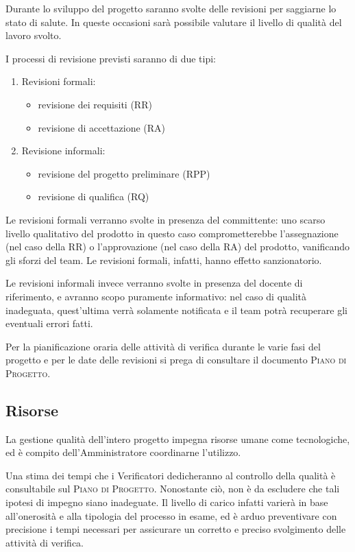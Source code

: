 \documentclass[11pt,a4paper]{article}
\begin{document}
Durante lo sviluppo del progetto saranno svolte delle revisioni per saggiarne lo stato di salute. In queste occasioni sarà possibile valutare il livello di qualità del lavoro svolto.

I processi di revisione previsti saranno di due tipi:
\begin{enumerate}
 	\item Revisioni formali:
	\begin{itemize}
		\item revisione dei requisiti (RR)
		\item revisione di accettazione (RA)
	\end{itemize}
 	\item Revisione informali:
	\begin{itemize}
		\item revisione del progetto preliminare (RPP)
		\item revisione di qualifica (RQ)
	\end{itemize}
\end{enumerate}
Le revisioni formali verranno svolte in presenza del committente: uno scarso livello qualitativo del prodotto in questo caso comprometterebbe l'assegnazione (nel caso della RR) o l'approvazione (nel caso della RA) del prodotto, vanificando gli sforzi del team. Le revisioni formali, infatti, hanno effetto sanzionatorio.

Le revisioni informali invece verranno svolte in presenza del docente di riferimento, e avranno scopo puramente informativo: nel caso di qualità ina\-deguata, quest'ultima verrà solamente notificata e il team potrà recuperare gli eventuali errori fatti.

Per la pianificazione oraria delle attività di verifica durante le varie fasi del progetto e per le date delle revisioni si prega di consultare il documento \textsc{Piano di Progetto}.
\subsection{Risorse}
La gestione qualità dell'intero progetto impegna risorse umane come tecnologiche, ed è compito dell'Amministratore coordinarne l'utilizzo.

Una stima dei tempi che i Verificatori dedicheranno al controllo della qualità è consultabile sul \textsc{Piano di Progetto}. Nonostante ciò, non è da escludere che tali ipotesi di impegno siano inadeguate. Il livello di carico infatti varierà in base all'onerosità e alla tipologia del processo in esame, ed è arduo preventivare con precisione i tempi necessari per assicurare un corretto e preciso svolgimento delle attività di verifica.
\end{document}
